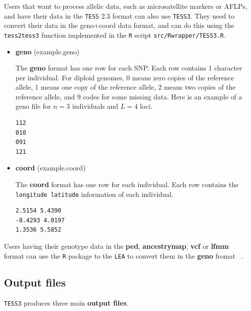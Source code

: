 \documentclass[10pt,a4paper]{article}
\begin{document}
Users that want to process allelic data, such as microsatellite markers or AFLPs, and have their data in the {\tt TESS} 2.3 format can also use {\tt TESS3}. They need to convert their data in the geno+coord data format, and can do this using the {\tt tess2tess3} function implemented in the {\tt R} script {\tt src/Rwrapper/TESS3.R}.




\begin{itemize}
\item {\bf geno} (example.geno)

The {\bf geno} format has one row for each SNP. Each row contains 1 character per individual. For diploid genomes,  0 means zero copies of the reference allele, 1 means one copy of the reference allele, 2 means two copies of the reference allele, and 9 codes for some missing data. Here is an example of a geno file for $n=3$ individuals and $L=4$ loci.
\\
\begin{center}
\footnotesize
\begin{Verbatim}[frame=single]
112
010
091
121
\end{Verbatim}
\end{center}


\item {\bf coord} (example.coord)

The {\bf coord} format has one row for each individual. Each row contains the \verb|longitude latitude| information of each individual.
\\
\begin{center}
\footnotesize
\begin{Verbatim}[frame=single]
2.5154 5.4390
-8.4293 4.0197
1.3536 5.5852
\end{Verbatim}
\end{center}

\end{itemize}

\noindent Users having their genotype data in the {\bf ped}, {\bf ancestrymap}, {\bf vcf} or {\bf lfmm} format  can use the {\tt R} package to the {\tt LEA} to convert them in the {\bf geno} fromat ~\cite{frichot2015lea}. 

\subsection{Output files}

{\tt TESS3} produces three main {\bf output files}.
\end{document}
